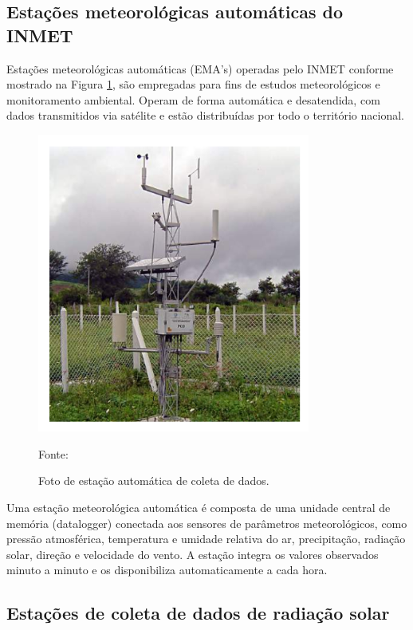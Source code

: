 \subsection{Estações meteorológicas automáticas do INMET}

Estações meteorológicas automáticas (EMA’s) operadas pelo INMET conforme mostrado na Figura \ref{fig:estacao_meteorologicas}, são empregadas para fins de estudos meteorológicos e monitoramento ambiental. Operam de forma automática e desatendida, com dados transmitidos via satélite e estão distribuídas por todo o território nacional.

\begin{figure}[H]
    \centering
    \includegraphics[width=0.8\textwidth]{./Figuras/estacao_meteorologicas.png}
    \caption{Foto de estação automática de coleta de dados.}{Fonte: \cite{atlas2017}}
   \label{fig:estacao_meteorologicas}
\end{figure}

Uma estação meteorológica automática é composta de uma unidade central de memória (datalogger) conectada aos sensores de parâmetros meteorológicos, como pressão atmosférica, temperatura e umidade relativa do ar, precipitação, radiação solar, direção e velocidade do vento. A estação integra os valores observados minuto a minuto e os disponibiliza automaticamente a cada hora.

\subsection{Estações de coleta de dados de radiação solar}

